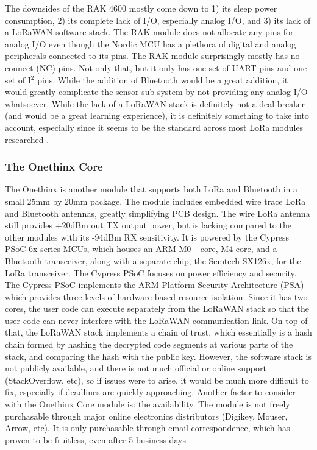 The downsides of the RAK 4600 mostly come down to 1) its sleep power
consumption, 2) its complete lack of I/O, especially analog I/O, and 3) its lack
of a LoRaWAN software stack. The RAK module does not allocate any pins for
analog I/O even though the Nordic MCU has a plethora of digital and analog
peripherals connected to its pins. The RAK module surprisingly mostly has no
connect (NC) pins. Not only that, but it only has one set of UART pins and one
set of I$^2$ pins. While the addition of Bluetooth would be a great addition, it
would greatly complicate the sensor sub-system by not providing any analog I/O
whatsoever. While the lack of a LoRaWAN stack is definitely not a deal breaker
(and would be a great learning experience), it is definitely something to take
into account, especially since it seems to be the standard across most LoRa
modules researched \cite{ds-rak4600}.

\subsubsection{The Onethinx Core}
The Onethinx is another module that supports both LoRa and Bluetooth in a small
25mm by 20mm package. The module includes embedded wire trace LoRa and Bluetooth
antennas, greatly simplifying PCB design. The wire LoRa antenna still provides
+20dBm out TX output power, but is lacking compared to the other modules with
its -94dBm RX sensitivity. It is powered by the Cypress PSoC 6x series MCUs,
which houses an ARM M0+ core, M4 core, and a Bluetooth transceiver, along with a
separate chip, the Semtech SX126x, for the LoRa transceiver. The Cypress PSoC
focuses on power efficiency and security. The Cypress PSoC implements the ARM
Platform Security Architecture (PSA) which provides three levels of
hardware-based resource isolation. Since it has two cores, the user code can
execute separately from the LoRaWAN stack so that the user code can never
interfere with the LoRaWAN communication link. On top of that, the LoRaWAN stack
implements a chain of trust, which essentially is a hash chain formed by hashing
the decrypted code segments at various parts of the stack, and comparing the
hash with the public key. However, the software stack is not publicly available,
and there is not much official or online support (StackOverflow, etc), so if
issues were to arise, it would be much more difficult to fix, especially if
deadlines are quickly approaching. Another factor to consider with the Onethinx
Core module is: the availability. The module is not freely purchasable through
major online electronics distributors (Digikey, Mouser, Arrow, etc). It is only
purchasable through email correspondence, which has proven to be fruitless, even
after 5 business days \cite{ds-onethinx}\cite{ds-sx1261}\cite{ds-psoc64bl}.

